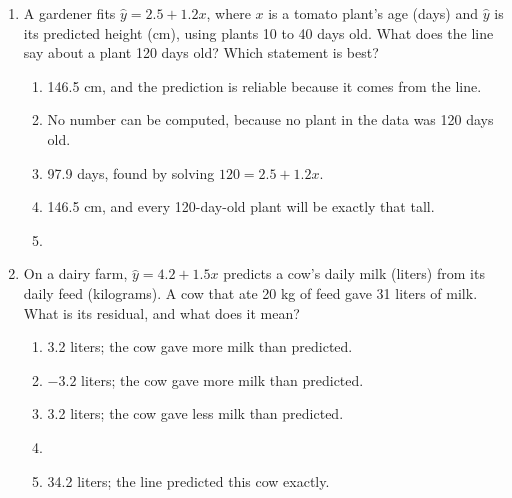 \documentclass[12pt]{article}
\begin{document}
\begin{enumerate}[leftmargin=1.9em, itemsep=0.13in]
  \boxguard[10]%
  \item A gardener fits $\hat{y} = 2.5 + 1.2x$, where $x$ is a tomato plant's age (days) and
        $\hat{y}$ is its predicted height (cm), using plants 10 to 40 days old. What does the
        line say about a plant 120 days old? Which statement is best?
        \begin{enumerate}[label=\textbf{(\Alph*)}, leftmargin=2.2em, itemsep=2pt]
          \item 146.5 cm, and the prediction is reliable because it comes from the line.
          \item No number can be computed, because no plant in the data was 120 days old.
          \item 97.9 days, found by solving $120 = 2.5 + 1.2x$.
          \item 146.5 cm, and every 120-day-old plant will be exactly that tall.
          \item {}\hfill{}\rule[-0.2in]{0pt}{0.48in}
        \end{enumerate}

  \boxguard[9]%
  \item On a dairy farm, $\hat{y} = 4.2 + 1.5x$ predicts a cow's daily milk (liters) from its
        daily feed (kilograms). A cow that ate 20 kg of feed gave 31 liters of milk. What is
        its residual, and what does it mean?
        \begin{enumerate}[label=\textbf{(\Alph*)}, leftmargin=2.2em, itemsep=2pt]
          \item 3.2 liters; the cow gave more milk than predicted.
          \item $-3.2$ liters; the cow gave more milk than predicted.
          \item 3.2 liters; the cow gave less milk than predicted.
          \item {}
          \item 34.2 liters; the line predicted this cow exactly.\hfill{}\rule[-0.2in]{0pt}{0.48in}
        \end{enumerate}


\end{enumerate}
\end{document}
